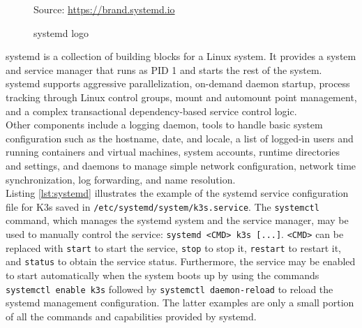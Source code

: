 \begin{figure} %
  \centering
  \def\stackalignment{r} %
  {\scriptsize \parbox[t]{\linewidth}{ Source: \url{https://brand.systemd.io}} }
  \caption{systemd logo}
\end{figure}

systemd is a collection of building blocks for a Linux system. It provides a
system and service manager that runs as PID 1 and starts the rest of the system.
\\ %
systemd supports aggressive parallelization, on-demand daemon startup, process
tracking through Linux control groups, mount and automount point management, and
a complex transactional dependency-based service control logic. \\ %
Other components include a logging daemon, tools to handle basic system configuration
such as the hostname, date, and locale, a list of logged-in users and running
containers and virtual machines, system accounts, runtime directories and
settings, and daemons to manage simple network configuration, network time
synchronization, log forwarding, and name resolution\cite{systemd}. \\ %
Listing \ref{lst:systemd} illustrates the example of the systemd service configuration
file for K3s saved in \texttt{/etc/systemd/system/k3s.service}. The \texttt{systemctl}
command, which manages the systemd system and the service manager, may be used to
manually control the service: \texttt{systemd <CMD> k3s [...]}. \texttt{<CMD>} can
be replaced with \texttt{start} to start the service, \texttt{stop} to stop it, \texttt{restart}
to restart it, and \texttt{status} to obtain the service status. Furthermore,
the service may be enabled to start automatically when the system boots up by
using the commands \texttt{systemctl enable k3s} followed by \texttt{systemctl daemon-reload}
to reload the systemd management configuration. The latter examples are only a small
portion of all the commands and capabilities provided by systemd.

